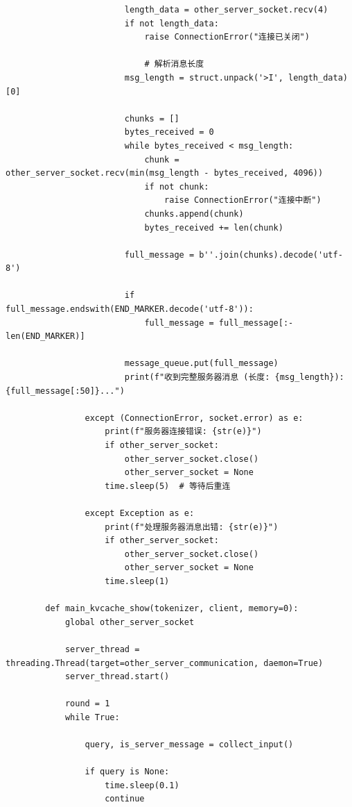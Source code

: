\documentclass[AutoFakeBold,AutoFakeSlant,language=chinese,degree=bachelor]{sustechthesis}
\begin{document}
\begin{itemize}
\begin{lstlisting}
                        length_data = other_server_socket.recv(4)
                        if not length_data:
                            raise ConnectionError("连接已关闭")

                            # 解析消息长度
                        msg_length = struct.unpack('>I', length_data)[0]

                        chunks = []
                        bytes_received = 0
                        while bytes_received < msg_length:
                            chunk = other_server_socket.recv(min(msg_length - bytes_received, 4096))
                            if not chunk:
                                raise ConnectionError("连接中断")
                            chunks.append(chunk)
                            bytes_received += len(chunk)

                        full_message = b''.join(chunks).decode('utf-8')

                        if full_message.endswith(END_MARKER.decode('utf-8')):
                            full_message = full_message[:-len(END_MARKER)]

                        message_queue.put(full_message)
                        print(f"收到完整服务器消息 (长度: {msg_length}): {full_message[:50]}...")

                except (ConnectionError, socket.error) as e:
                    print(f"服务器连接错误: {str(e)}")
                    if other_server_socket:
                        other_server_socket.close()
                        other_server_socket = None
                    time.sleep(5)  # 等待后重连

                except Exception as e:
                    print(f"处理服务器消息出错: {str(e)}")
                    if other_server_socket:
                        other_server_socket.close()
                        other_server_socket = None
                    time.sleep(1)

        def main_kvcache_show(tokenizer, client, memory=0):
            global other_server_socket

            server_thread = threading.Thread(target=other_server_communication, daemon=True)
            server_thread.start()

            round = 1
            while True:

                query, is_server_message = collect_input()

                if query is None:
                    time.sleep(0.1)
                    continue


\end{lstlisting}
\end{itemize}
\end{document}
